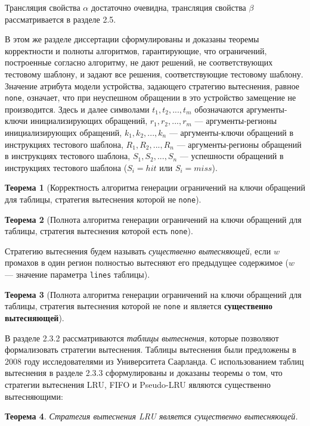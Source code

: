 \documentclass[14pt,autoref,href
,facsimile
]{disser}
\newtheorem{theorem}{Теорема}
\begin{document}
Трансляция свойства $\alpha$ достаточно очевидна, трансляция свойства $\beta$ рассматривается в разделе 2.5.

В этом же разделе диссертации сформулированы и доказаны теоремы корректности и полноты алгоритмов, гарантирующие, что ограничений, построенные согласно алгоритму, не дают решений, не соответствующих тестовому шаблону, и задают все решения, соответствующие тестовому шаблону. Значение атрибута модели устройства, задающего стратегию вытеснения, равное \texttt{none}, означает, что при неуспешном обращении в это устройство замещение не производится. Здесь и далее символами $t_1, t_2, ..., t_m$ обозначаются аргументы-ключи инициализирующих обращений, $r_1, r_2, ..., r_m$ --- аргументы-регионы инициализирующих обращений, $k_1, k_2, ..., k_n$ --- аргументы-ключи обращений в инструкциях тестового шаблона, $R_1, R_2, ..., R_n$ --- аргументы-регионы обращений в инструкциях тестового шаблона, $S_1, S_2, ..., S_n$ --- успешности обращений в инструкциях тестового шаблона ($S_i = hit$ или $S_i = miss$).

\begin{theorem}[Корректность алгоритма генерации ограничений на ключи обращений для таблицы, стратегия вытеснения которой не \texttt{none}]\label{mirror_correctness}
\CorrectnessMirror
\end{theorem}

\begin{theorem}[Полнота алгоритма генерации ограничений на ключи обращений для таблицы, стратегия вытеснения которой есть \texttt{none}]\label{mirror_fullness_none}
\FullnessMirrorNone
\end{theorem}

Стратегию вытеснения будем называть \emph{существенно вытесняющей}, если $w$ промахов в один регион полностью вытесняют его предыдущее содержимое ($w$ --- значение параметра \texttt{lines} таблицы).

\begin{theorem}[Полнота алгоритма генерации ограничений на ключи обращений для таблицы, стратегия вытеснения которой не \texttt{none} и является \textbf{существенно вытесняющей}]\label{mirror_fullness}
\FullnessMirror
\end{theorem}

В разделе 2.3.2 рассматриваются \emph{таблицы вытеснения}, которые позволяют формализовать стратегии вытеснения. Таблицы вытеснения были предложены в 2008 году исследователями из Университета Саарланда. С использованием таблиц вытеснения в разделе 2.3.3 сформулированы и доказаны теоремы о том, что стратегии вытеснения LRU, FIFO и Pseudo-LRU являются существенно вытесняющими:
\begin{theorem}\label{thm:LRU_essential}
Стратегия вытеснения LRU является существенно вытесняющей.
\end{theorem}
\end{document}

